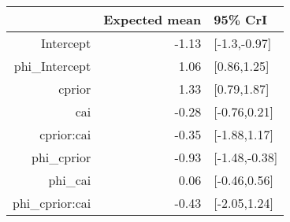 \begin{tabular}{rrl}
  \hline
 & Expected mean & 95\% CrI \\ 
  \hline
Intercept & -1.13 & [-1.3,-0.97] \\ 
  phi\_Intercept & 1.06 & [0.86,1.25] \\ 
  cprior & 1.33 & [0.79,1.87] \\ 
  cai & -0.28 & [-0.76,0.21] \\ 
  cprior:cai & -0.35 & [-1.88,1.17] \\ 
  phi\_cprior & -0.93 & [-1.48,-0.38] \\ 
  phi\_cai & 0.06 & [-0.46,0.56] \\ 
  phi\_cprior:cai & -0.43 & [-2.05,1.24] \\ 
   \hline
\end{tabular}

